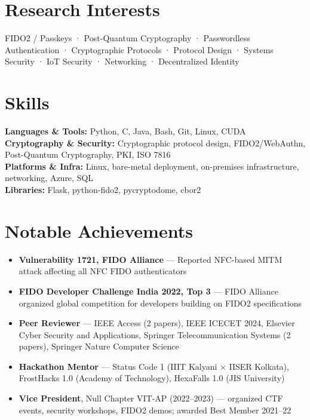 \documentclass[10pt, a4paper]{article}
\begin{document}
\section*{Research Interests}

\noindent FIDO2 / Passkeys · Post-Quantum Cryptography · Passwordless Authentication · Cryptographic Protocols · Protocol Design · Systems Security · IoT Security · Networking · Decentralized Identity

\section*{Skills}

\noindent\textbf{Languages \& Tools:} Python, C, Java, Bash, Git, Linux, CUDA\\
\textbf{Cryptography \& Security:} Cryptographic protocol design, FIDO2/WebAuthn, Post-Quantum Cryptography, PKI, ISO 7816\\
\textbf{Platforms \& Infra:} Linux, bare-metal deployment, on-premises infrastructure, networking, Azure, SQL\\
\textbf{Libraries:} Flask, python-fido2, pycryptodome, cbor2

\section*{Notable Achievements}

\begin{itemize}
    \item \textbf{Vulnerability 1721, FIDO Alliance} --- Reported NFC-based MITM attack affecting all NFC FIDO authenticators
    \item \textbf{FIDO Developer Challenge India 2022, Top 3} --- FIDO Alliance organized global competition for developers building on FIDO2 specifications
    \item \textbf{Peer Reviewer} --- IEEE Access (2 papers), IEEE ICECET 2024, Elsevier Cyber Security and Applications, Springer Telecommunication Systems (2 papers), Springer Nature Computer Science
    \item \textbf{Hackathon Mentor} --- Status Code 1 (IIIT Kalyani $\times$ IISER Kolkata), FrostHacks 1.0 (Academy of Technology), HexaFalls 1.0 (JIS University)
    \item \textbf{Vice President}, Null Chapter VIT-AP (2022--2023) --- organized CTF events, security workshops, FIDO2 demos; awarded Best Member 2021--22
\end{itemize}
\end{document}
